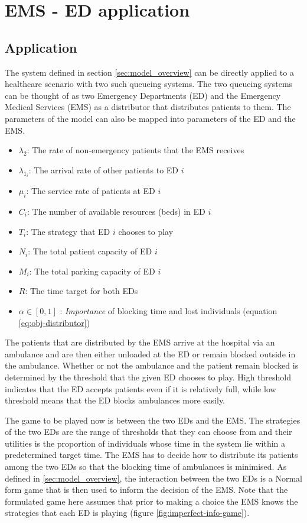 \section{EMS - ED application}

\subsection{Application}

The system defined in section \ref{sec:model_overview} can be directly applied 
to a healthcare scenario with two such queueing systems.
The two queueing systems can be thought of as two Emergency Departments (ED) and 
the Emergency Medical Services (EMS) as a distributor that distributes 
patients to them.
The parameters of the model can also be mapped into parameters of the ED and 
the EMS.

\begin{itemize}
    \item \( \lambda_2 \): The rate of non-emergency patients that the EMS 
    receives
    \item \( \lambda_{1_i} \): The arrival rate of other patients to ED \(i\)
    \item \( \mu_i \): The service rate of patients at ED \(i\)
    \item \( C_i \): The number of available resources (beds) in ED \(i\)  
    \item \( T_i \): The strategy that ED \(i\) chooses to play
    \item \( N_i \): The total patient capacity of ED \(i\)
    \item \( M_i \): The total parking capacity of ED \(i\)
    \item \( R \): The time target for both EDs
    \item \( \alpha \in [0, 1] \) : \textit{Importance} of blocking time and 
    lost individuals (equation \ref{eq:obj-distributor})
\end{itemize}

The patients that are distributed by the EMS arrive at the hospital via an 
ambulance and are then either unloaded at the ED or remain blocked outside in 
the ambulance.
Whether or not the ambulance and the patient remain blocked is determined by 
the threshold that the given ED chooses to play.
High threshold indicates that the ED accepts patients even if it is relatively 
full, while low threshold means that the ED blocks ambulances more easily.

The game to be played now is between the two EDs and the EMS. 
The strategies of the two EDs are the range of thresholds that they can choose
from and their utilities is the proportion of individuals whose time in the 
system lie within a predetermined target time.
The EMS has to decide how to distribute its patients among the two EDs so that 
the blocking time of ambulances is minimised. 
As defined in \ref{sec:model_overview}, the interaction between the two EDs 
is a Normal form game that is then used to inform the decision of the EMS.
Note that the formulated game here assumes that prior to making a choice the 
EMS knows the strategies that each ED is playing (figure 
\ref{fig:imperfect-info-game}).


